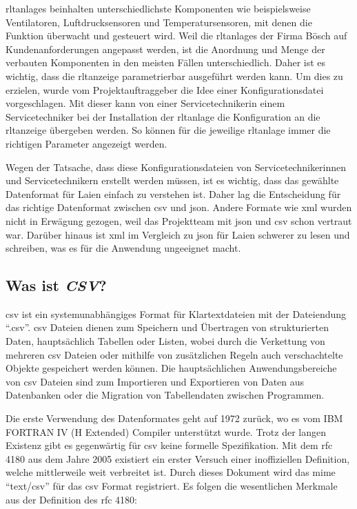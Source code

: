 \acp{rltanlage} beinhalten unterschiedlichste Komponenten wie beispielsweise Ventilatoren, Luftdrucksensoren und Temperatursensoren, mit denen die Funktion überwacht und gesteuert wird. Weil die \acp{rltanlage} der Firma Bösch auf Kundenanforderungen angepasst werden, ist die Anordnung und Menge der verbauten Komponenten in den meisten Fällen unterschiedlich. Daher ist es wichtig, dass die \ac{rltanzeige} parametrierbar ausgeführt werden kann. Um dies zu erzielen, wurde vom Projektauftraggeber die Idee einer Konfigurationsdatei vorgeschlagen. Mit dieser kann von einer  Servicetechnikerin \bzw einem Servicetechniker bei der Installation der \ac{rltanlage} die Konfiguration an die \ac{rltanzeige} übergeben werden. So können für die jeweilige \ac{rltanlage} immer die richtigen Parameter angezeigt werden.

Wegen der Tatsache, dass diese Konfigurationsdateien von Servicetechnikerinnen und Servicetechnikern erstellt werden müssen, ist es wichtig, dass das gewählte Datenformat für Laien einfach zu verstehen ist. Daher lag die Entscheidung für das richtige Datenformat zwischen \acf{csv} und \acf{json}. Andere Formate  wie \acf{xml} wurden nicht in Erwägung gezogen, weil das Projektteam mit \ac{json} und \ac{csv} schon vertraut war. Darüber hinaus ist \ac{xml} im Vergleich zu \ac{json} für Laien schwerer zu lesen und schreiben, was es für die Anwendung ungeeignet macht. 

\subsection{Was ist \textit{CSV}?}\label{csv_kapitel}
\acf{csv} ist ein systemunabhängiges Format für Klartextdateien mit der Dateiendung \enquote{.csv}. \ac{csv} Dateien dienen zum Speichern und Übertragen von strukturierten Daten, hauptsächlich Tabellen oder Listen, wobei durch die Verkettung von mehreren \ac{csv} Dateien oder mithilfe von zusätzlichen Regeln auch verschachtelte Objekte gespeichert werden können. Die hauptsächlichen Anwendungsbereiche von \ac{csv} Dateien sind zum Importieren und Exportieren von Daten aus Datenbanken oder die Migration von Tabellendaten zwischen Programmen. \cite[vgl.][]{FuchsMediaSolutions:o.J.}

Die erste Verwendung des Datenformates geht auf 1972 zurück, wo es vom IBM FORTRAN IV (H Extended) Compiler unterstützt wurde. \cite[vgl.][]{IBM:1972} Trotz der langen Existenz gibt es gegenwärtig für \ac{csv} keine formelle Spezifikation. Mit dem \ac{rfc} 4180 \cite[vgl.][]{Shafranovich:2005} aus dem Jahre 2005 existiert ein erster Versuch einer inoffiziellen Definition, welche mittlerweile weit verbreitet ist. Durch dieses Dokument wird das \acf{mime} \enquote{text/csv} für das \ac{csv} Format registriert. Es folgen die wesentlichen Merkmale aus der Definition des \ac{rfc} 4180:

